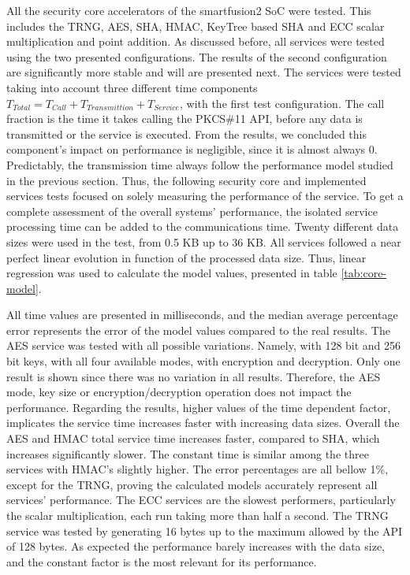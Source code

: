 All the security core accelerators of the smartfusion2 SoC were tested. This includes the \ac{TRNG}, \ac{AES}, \ac{SHA}, \ac{HMAC}, KeyTree based \ac{SHA} and \ac{ECC} scalar multiplication and point addition.
As discussed before, all services were tested using the two presented configurations. The results of the second configuration are significantly more stable and will are presented next.
The services were tested taking into account three different time components \(T_{Total} = T_{Call} + T_{Transmittion} + T_{Service}\), with the first test configuration. The call fraction is the time it takes calling the PKCS\#11 API, before any data is transmitted or the service is executed. From the results, we concluded this component's impact on performance is negligible, since it is almost always 0.
Predictably, the transmission time always follow the performance model studied in the previous section.
Thus, the following security core and implemented services tests focused on solely measuring the performance of the service. To get a complete assessment of the overall systems' performance, the isolated service processing time can be added to the communications time.
Twenty different data sizes were used in the test, from 0.5 KB up to 36 KB.
All services followed a near perfect linear evolution in function of the processed data size. Thus, linear regression was used to calculate the model values, presented in table \ref{tab:core-model}.



All time values are presented in milliseconds, and the median average percentage error represents the error of the model values compared to the real results.
The \ac{AES} service was tested with all possible variations. Namely, with 128 bit and 256 bit keys, with all four available modes, with encryption and decryption. Only one result is shown since there was no variation in all results. Therefore, the \ac{AES} mode, key size or encryption/decryption operation does not impact the performance.
Regarding the results, higher values of the time dependent factor, implicates the service time increases faster with increasing data sizes. Overall the \ac{AES} and \ac{HMAC} total service time increases faster, compared to \ac{SHA}, which increases significantly slower. The constant time is similar among the three services with \ac{HMAC}'s slightly higher.
The error percentages are all bellow 1\%, except for the TRNG, proving the calculated models accurately represent all services' performance.
The \ac{ECC} services are the slowest performers, particularly the scalar multiplication, each run taking more than half a second.
The TRNG service was tested by generating 16 bytes up to the maximum allowed by the API of 128 bytes. As expected the performance barely increases with the data size, and the constant factor is the most relevant for its performance.

